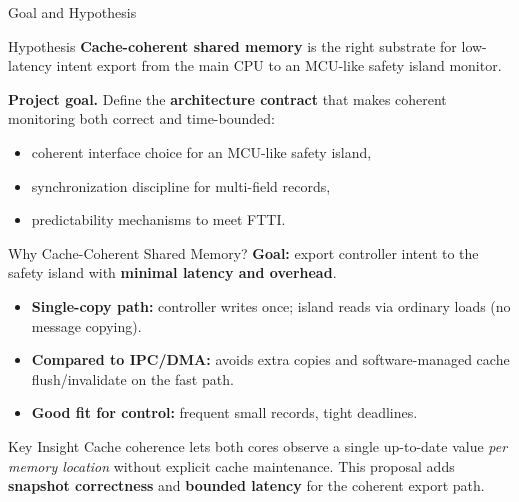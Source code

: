 \documentclass[aspectratio=169,12pt]{beamer}
\newcommand{\hl}[1]{\textcolor{Accent}{\textbf{#1}}}
\newcommand{\SafetyIsland}{safety island\xspace}
\newcommand{\PrimaryCompute}{main CPU\xspace}
\newcommand{\FTTI}{FTTI\xspace}
\begin{document}
\begin{frame}{Goal and Hypothesis}
\begin{alertblock}{Hypothesis}
\hl{Cache-coherent shared memory} is the right substrate for low-latency intent export from the \PrimaryCompute to an MCU-like \SafetyIsland monitor.
\end{alertblock}

\vspace{0.6em}
\textbf{Project goal.} Define the \hl{architecture contract} that makes coherent monitoring both correct and time-bounded:
\begin{itemize}
\item coherent interface choice for an MCU-like \SafetyIsland,
\item synchronization discipline for multi-field records,
\item predictability mechanisms to meet \FTTI.
\end{itemize}
\end{frame}

\begin{frame}{Why Cache-Coherent Shared Memory?}
\textbf{Goal:} export controller intent to the \SafetyIsland with \hl{minimal latency and overhead}.

\vspace{0.4em}
\begin{itemize}
\item \textbf{Single-copy path:} controller writes once; island reads via ordinary loads (no message copying).
\item \textbf{Compared to IPC/DMA:} avoids extra copies and software-managed cache flush/invalidate on the fast path.
\item \textbf{Good fit for control:} frequent small records, tight deadlines.
\end{itemize}

\vspace{0.5em}
\begin{block}{Key Insight}
Cache coherence lets both cores observe a single up-to-date value \emph{per memory location} without explicit cache maintenance. This proposal adds \hl{snapshot correctness} and \hl{bounded latency} for the coherent export path.
\end{block}
\end{frame}
\end{document}
